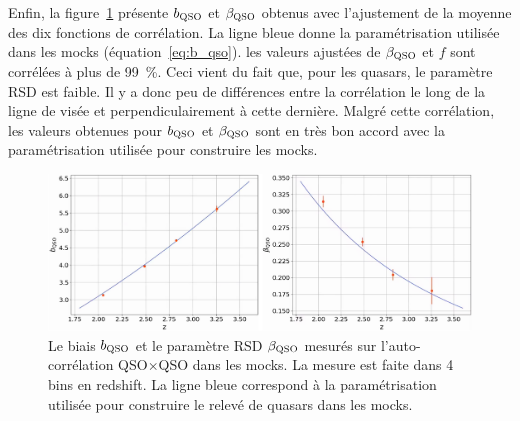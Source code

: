 Enfin, la figure~\ref{fig:bias_auto_qso} présente $b_{\textsc{QSO}}$ et $\beta_{\textsc{QSO}}$ obtenus avec l'ajustement de la moyenne des dix fonctions de corrélation.
La ligne bleue donne la paramétrisation utilisée dans les mocks (équation~\ref{eq:b_qso}).
les valeurs ajustées de $\beta_{\textsc{QSO}}$ et $f$ sont corrélées à plus de \SI{99}{\percent}. Ceci vient du fait que, pour les quasars, le paramètre RSD est faible. Il y a donc peu de différences entre la corrélation le long de la ligne de visée et perpendiculairement à cette dernière.
Malgré cette corrélation, les valeurs obtenues pour $b_{\textsc{QSO}}$ et $\beta_{\textsc{QSO}}$ sont en très bon accord avec la paramétrisation utilisée pour construire les mocks.
\begin{figure}
  \centering
  \includegraphics[scale=0.42]{bias_auto_qso}
  \caption{Le biais $b_{\textsc{QSO}}$ et le paramètre RSD $\beta_{\textsc{QSO}}$ mesurés sur l'auto-corrélation QSO$\times$QSO dans les mocks. La mesure est faite dans 4 bins en redshift. La ligne bleue correspond à la paramétrisation utilisée pour construire le relevé de quasars dans les mocks.}
  \label{fig:bias_auto_qso}
\end{figure}

